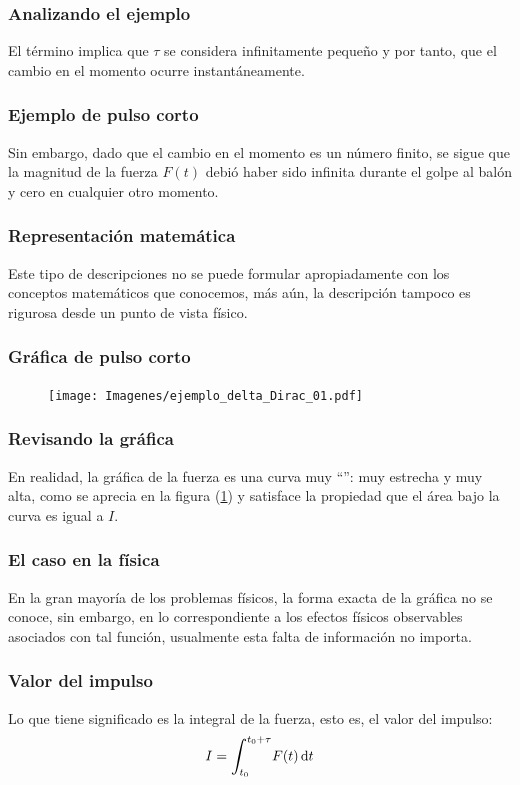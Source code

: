 \documentclass[12pt]{beamer}
\begin{document}
\begin{frame}
\frametitle{Analizando el ejemplo}
El término  implica que $\tau$ se considera infinitamente pequeño \pause y por tanto, que el cambio en el momento ocurre instantáneamente.
\end{frame}

\begin{frame}
\frametitle{Ejemplo de pulso corto}
Sin embargo, dado que el cambio en el momento es un número finito, \pause se sigue que la magnitud de la fuerza $F (t)$ debió haber sido infinita durante el golpe al balón y cero en cualquier otro momento.
\end{frame}

\begin{frame}
\frametitle{Representación matemática}
Este tipo de descripciones no se puede formular apropiadamente con los conceptos matemáticos que conocemos, más aún, la descripción tampoco es rigurosa desde un punto de vista físico.
\end{frame}

\begin{frame}
\frametitle{Gráfica de pulso corto}
\begin{figure}[H]
    \centering
    \texttt{[image: Imagenes/ejemplo\_delta\_Dirac\_01.pdf]}
    \label{fig:figura_delta_Dirac_01}
\end{figure}
\end{frame}

\begin{frame}
\frametitle{Revisando la gráfica}
En realidad, la gráfica de la fuerza es una curva muy \enquote{}: muy estrecha y muy alta, como se aprecia en la figura (\ref{fig:figura_delta_Dirac_01}) \pause y satisface la propiedad que el área bajo la curva es igual a $I$.
\end{frame}

\begin{frame}
\frametitle{El caso en la física}
En la gran mayoría de los problemas físicos, la forma exacta de la gráfica no se conoce, \pause sin embargo, en lo correspondiente a los efectos físicos observables asociados con tal función, usualmente esta falta de información no importa.
\end{frame}

\begin{frame}
\frametitle{Valor del impulso}
Lo que tiene significado es la integral de la fuerza, esto es, el valor del impulso:
\pause
\begin{align*}
I = \scaleint{6ex}_{\bs t_{0}}^{t_{0} + \tau } F (t) \dd{t}
\end{align*}
\end{frame}
\end{document}
